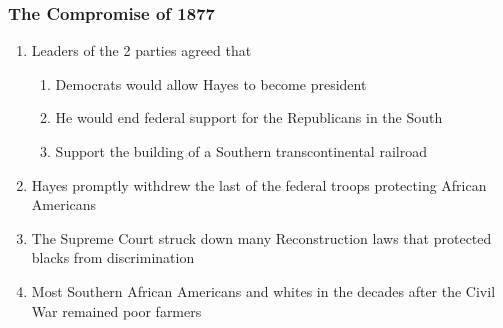 \documentclass[12pt]{article} %
\begin{document}
\subsubsection{The Compromise of 1877}
\begin{enumerate}
	\item Leaders of the 2 parties agreed that 
	\begin{enumerate}
		\item Democrats would allow Hayes to become president
		\item He would end federal support for the Republicans in the South
		\item Support the building of a Southern transcontinental railroad
	\end{enumerate}
	\item Hayes promptly withdrew the last of the federal troops protecting African Americans
	\item The Supreme Court struck down many Reconstruction laws that protected blacks from 
		discrimination
	\item Most Southern African Americans and whites in the decades after the Civil War remained 
		poor farmers
\end{enumerate}
\end{document}
